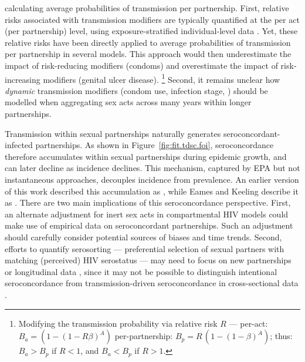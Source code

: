 calculating average probabilities of transmission per partnership.
First, relative risks associated with transmission modifiers
are typically quantified at the per act (\vs per partnership) level, using
exposure-stratified individual-level data \cite{Gray2001,Wawer2005,Boily2009}.
Yet, these relative risks have been directly applied to
average probabilities of transmission per partnership in several models.
This approach would then
underestimate the impact of risk-reducing modifiers (\eg condoms) and
overestimate the impact of risk-increasing modifiers (\eg genital ulcer disease).%
\footnote{Modifying the transmission probability via relative risk $R$ ---
  per-act: $B_a = (1 - {(1 - R\beta)}^A)$ \vs per-partnership: $B_p = R\,(1 - {(1 - \beta)}^A)$;
  thus: $B_a > B_p$ if $R < 1$, and $B_a < B_p$ if $R > 1$.}
Second, it remains unclear how \emph{dynamic} transmission modifiers
(\eg condom use, infection stage, )
should be modelled when aggregating sex acts across many years within longer partnerships.
\par %
Transmission within sexual partnerships naturally generates seroconcordant-infected partnerships.
As shown in Figure~\ref{fig:fit.tdsc.foi}, seroconcordance therefore
accumulates within sexual partnerships during epidemic growth,
and can later decline as incidence declines.
This mechanism, captured by EPA but not instantaneous approaches,
decouples incidence from prevalence.
An earlier version of this work \cite{Knight2022smdm}
described this accumulation as , while
Eames and Keeling \cite{Eames2002} describe it as
.
There are two main implications of this seroconcordance perspective.
First, an alternate adjustment for inert sex acts in compartmental HIV models
could make use of empirical data on seroconcordant partnerships.
Such an adjustment should carefully consider potential sources of biases and time trends.
Second, efforts to quantify serosorting --- preferential selection of sexual partners
with matching (perceived) HIV serostatus \cite{Cassels2013} ---
may need to focus on new partnerships or longitudinal data \cite{Kim2020},
since it may not be possible to distinguish intentional seroconcordance
from transmission-driven seroconcordance in cross-sectional data \cite{Cassels2009}.
\par %
